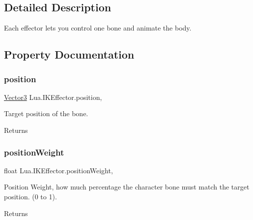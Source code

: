 \subsection{Detailed Description}
Each effector lets you control one bone and animate the body. 



\subsection{Property Documentation}
\mbox{\label{class_lua_1_1_i_k_effector_a8fca3762ba9e4b8e90d21f7bd701048a}} 
\subsubsection{\texorpdfstring{position}{position}}
{\footnotesize\ttfamily \mbox{\hyperlink{class_lua_1_1_vector3}{Vector3}} Lua.\+I\+K\+Effector.\+position\hspace{0.3cm}{\ttfamily [get]}, {\ttfamily [set]}}



Target position of the bone. 

\begin{DoxyReturn}{Returns}

\end{DoxyReturn}
\mbox{\label{class_lua_1_1_i_k_effector_a9237f631ddbe3043a8be096d4a51a5dd}} 
\subsubsection{\texorpdfstring{positionWeight}{positionWeight}}
{\footnotesize\ttfamily float Lua.\+I\+K\+Effector.\+position\+Weight\hspace{0.3cm}{\ttfamily [get]}, {\ttfamily [set]}}



Position Weight, how much percentage the character bone must match the target position. (0 to 1). 

\begin{DoxyReturn}{Returns}

\end{DoxyReturn}
\mbox{\label{class_lua_1_1_i_k_effector_adb93ca27f68dbfc04d70e0df9f285210}} 
